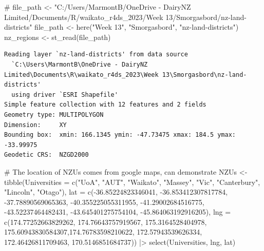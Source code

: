 \documentclass[
  letterpaper,
  DIV=11,
  numbers=noendperiod]{scrartcl}
\newenvironment{Shaded}{\begin{snugshade}}{\end{snugshade}}
\newcommand{\AttributeTok}[1]{\textcolor[rgb]{0.40,0.45,0.13}{#1}}
\newcommand{\CommentTok}[1]{\textcolor[rgb]{0.37,0.37,0.37}{#1}}
\newcommand{\FloatTok}[1]{\textcolor[rgb]{0.68,0.00,0.00}{#1}}
\newcommand{\FunctionTok}[1]{\textcolor[rgb]{0.28,0.35,0.67}{#1}}
\newcommand{\NormalTok}[1]{\textcolor[rgb]{0.00,0.23,0.31}{#1}}
\newcommand{\OtherTok}[1]{\textcolor[rgb]{0.00,0.23,0.31}{#1}}
\newcommand{\SpecialCharTok}[1]{\textcolor[rgb]{0.37,0.37,0.37}{#1}}
\newcommand{\StringTok}[1]{\textcolor[rgb]{0.13,0.47,0.30}{#1}}
\begin{document}
\begin{Shaded}
\begin{Highlighting}[]
\CommentTok{\# file\_path \textless{}{-} "C:/Users/MarmontB/OneDrive {-} DairyNZ Limited/Documents/R/waikato\_r4ds\_2023/Week 13/Smorgasbord/nz{-}land{-}districts"}
\NormalTok{file\_path }\OtherTok{\textless{}{-}} \FunctionTok{here}\NormalTok{(}\StringTok{"Week 13"}\NormalTok{, }\StringTok{"Smorgasbord"}\NormalTok{, }\StringTok{"nz{-}land{-}districts"}\NormalTok{)}
\NormalTok{nz\_regions }\OtherTok{\textless{}{-}} \FunctionTok{st\_read}\NormalTok{(file\_path)}
\end{Highlighting}
\end{Shaded}

\begin{verbatim}
Reading layer `nz-land-districts' from data source 
  `C:\Users\MarmontB\OneDrive - DairyNZ Limited\Documents\R\waikato_r4ds_2023\Week 13\Smorgasbord\nz-land-districts' 
  using driver `ESRI Shapefile'
Simple feature collection with 12 features and 2 fields
Geometry type: MULTIPOLYGON
Dimension:     XY
Bounding box:  xmin: 166.1345 ymin: -47.73475 xmax: 184.5 ymax: -33.99975
Geodetic CRS:  NZGD2000
\end{verbatim}

\begin{Shaded}
\begin{Highlighting}[]
\CommentTok{\# The location of NZUs comes from google maps, can demonstrate}
\NormalTok{NZUs }\OtherTok{\textless{}{-}} \FunctionTok{tibble}\NormalTok{(}\AttributeTok{Universities =} \FunctionTok{c}\NormalTok{(}\StringTok{"UoA"}\NormalTok{, }\StringTok{"AUT"}\NormalTok{, }\StringTok{"Waikato"}\NormalTok{, }\StringTok{"Massey"}\NormalTok{, }\StringTok{"Vic"}\NormalTok{, }\StringTok{"Canterbury"}\NormalTok{, }\StringTok{"Lincoln"}\NormalTok{, }\StringTok{"Otago"}\NormalTok{),}
               \AttributeTok{lat =} \FunctionTok{c}\NormalTok{(}\SpecialCharTok{{-}}\FloatTok{36.85224823346041}\NormalTok{, }\SpecialCharTok{{-}}\FloatTok{36.853412307817784}\NormalTok{, }\SpecialCharTok{{-}}\FloatTok{37.78890569065363}\NormalTok{, }\SpecialCharTok{{-}}\FloatTok{40.355225055311955}\NormalTok{, }\SpecialCharTok{{-}}\FloatTok{41.29002684516775}\NormalTok{, }\SpecialCharTok{{-}}\FloatTok{43.52237464482431}\NormalTok{, }\SpecialCharTok{{-}}\FloatTok{43.645401275754104}\NormalTok{, }\SpecialCharTok{{-}}\FloatTok{45.864063192916205}\NormalTok{),}
               \AttributeTok{lng =} \FunctionTok{c}\NormalTok{(}\FloatTok{174.77252663829262}\NormalTok{, }\FloatTok{174.76643757919567}\NormalTok{, }\FloatTok{175.3164528404978}\NormalTok{, }\FloatTok{175.60943830584307}\NormalTok{,}\FloatTok{174.76783598210622}\NormalTok{, }\FloatTok{172.57943539626334}\NormalTok{, }\FloatTok{172.46426811709463}\NormalTok{, }\FloatTok{170.5146851684737}\NormalTok{))  }\SpecialCharTok{|\textgreater{}}  
  \FunctionTok{select}\NormalTok{(Universities, lng, lat)}
\end{Highlighting}
\end{Shaded}
\end{document}
